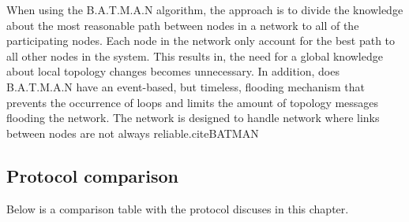 When using the B.A.T.M.A.N algorithm, the approach is to divide the knowledge about the most reasonable path between nodes in a network to all of the participating nodes.
Each node in the network only account for the best path to all other nodes in the system.
This results in, the need for a global knowledge about local topology changes becomes unnecessary.
In addition, does B.A.T.M.A.N have an event-based, but timeless, flooding mechanism that prevents the occurrence of loops and limits the amount of topology messages flooding the network.
The network is designed to handle network where links between nodes are not always reliable.cite{BATMAN}

\subsection{Protocol comparison}
Below is a comparison table with the protocol discuses in this chapter.

